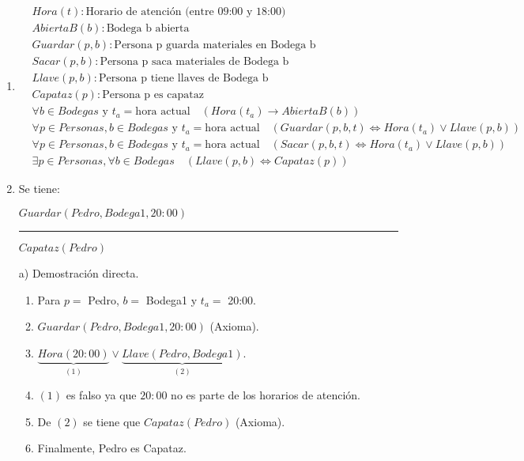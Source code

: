 \documentclass[11pt]{utalcaDoc}
\begin{document}
\begin{enumerate}
\item 

\begin{align*}
&Hora(t) : \text{Horario de atención (entre 09:00 y 18:00)}\\
&AbiertaB(b) : \text{Bodega b abierta}\\
&Guardar(p,b) : \text{Persona p guarda materiales en Bodega b}\\
&Sacar(p,b) : \text{Persona p saca materiales de Bodega b}\\
&Llave(p,b) : \text{Persona p tiene llaves de Bodega b}\\
&Capataz(p) : \text{Persona p es capataz}\\
&\forall b \in Bodegas \text{ y } t_a = \text{hora actual} \quad (Hora(t_a) \to AbiertaB(b))\\
&\forall p \in Personas, b \in Bodegas \text{ y } t_a = \text{hora actual} \quad (Guardar(p,b,t) \iff Hora(t_a) \lor Llave(p,b))\\
&\forall p \in Personas, b \in Bodegas \text{ y } t_a = \text{hora actual} \quad (Sacar(p,b,t) \iff Hora(t_a) \lor Llave(p,b))\\
&\exists p \in Personas, \forall b \in Bodegas \quad (Llave(p,b) \iff Capataz(p))
\end{align*}


\item Se tiene:



$Guardar(Pedro,Bodega1,20:00)$

\rule[0.1cm]{10cm}{0.1pt}

$Capataz(Pedro)$

a) Demostración directa.
\begin{enumerate}
\item Para $p = $ Pedro, $b = $ Bodega1 y $t_a = $ 20:00.
\item $Guardar(Pedro,Bodega1,20:00)$ (Axioma).
\item $\underbrace{Hora(20:00)}_{(1)} \lor \underbrace{Llave(Pedro, Bodega1)}_{(2)}$.
\item $(1)$ es falso ya que $20:00$ no es parte de los horarios de atención.
\item De $(2)$ se tiene que $Capataz(Pedro)$ (Axioma).
\item Finalmente, Pedro es Capataz.
\end{enumerate}


\end{enumerate}
\end{document}

